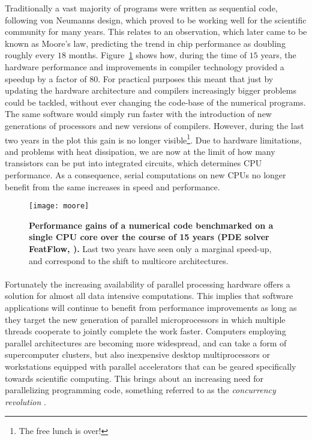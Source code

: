Traditionally a vast majority of programs were written as sequential code, following von Neumanns design, which proved to be working well for the scientific community for many years.
This relates to an observation, which later came to be known as Moore's law, predicting the trend in chip performance as doubling roughly every $18$ months.
Figure~\ref{fig:moore} shows how, during the time of $15$ years, the hardware performance and improvements in compiler technology provided a speedup by a factor of $80$.
For practical purposes this meant that just by updating the hardware architecture and compilers increasingly bigger problems could be tackled, without ever changing the code-base of the numerical programs. 
The same software would simply run faster with the introduction of new generations of processors and new versions of compilers.
However, during the last two years in the plot this gain is no longer visible\footnote{The free lunch is over!}.
Due to hardware limitations, and problems with heat dissipation, we are now at the limit of how many transistors can be put into integrated circuits, which determines CPU performance.
As a consequence, serial computations on new CPUs no longer benefit from the same increases in speed and performance.

\begin{figure}[h!]
\centering
\texttt{[image: moore]}
\caption{
{ \footnotesize 
{\bf Performance gains of a numerical code benchmarked on a single CPU core over the course of 15 years (PDE solver FeatFlow, \citep{Turek1999}).}
Last two years have seen only a marginal speed-up, and correspond to the shift to multicore architectures.
} %
}
\label{fig:moore}
\end{figure}


\paragraph{}
Fortunately the increasing availability of parallel processing hardware offers a solution for almost all data intensive computations.
This implies that software applications will continue to benefit from performance improvements as long as they target the new generation of parallel microprocessors in which multiple threads cooperate to jointly complete the work faster.
Computers employing parallel architectures are becoming more widespread, and can take a form of supercomputer clusters, but also inexpensive desktop multiprocessors or workstations equipped with parallel accelerators that can be geared specifically towards scientific computing.
This brings about an increasing need for parallelizing programming code, something referred to as the \textit{concurrency revolution} \citep{Sutter2005}.

